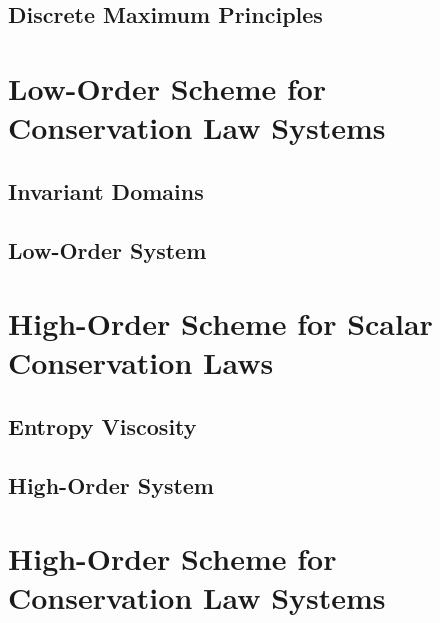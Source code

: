 \subsection{Discrete Maximum Principles\label{sec:DMP}}
  
  
  
\section{Low-Order Scheme for Conservation Law Systems}\label{sec:low_order_system}
\subsection{Invariant Domains\label{sec:invariant_domains}}
  
\subsection{Low-Order System\label{sec:low_order_scheme_system}}
  
\section{High-Order Scheme for Scalar Conservation Laws
  \label{sec:high_order_scalar}}  
\subsection{Entropy Viscosity\label{sec:entropy_viscosity_scalar}}
    
\subsection{High-Order System\label{sec:high_order_scheme_scalar}}
  
\section{High-Order Scheme for Conservation Law Systems
  \label{sec:high_order_system}}  
